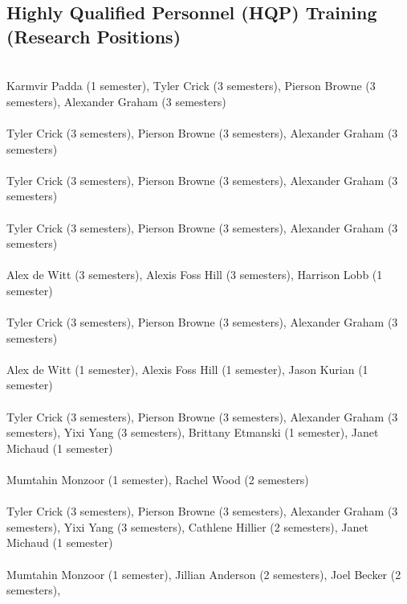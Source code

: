 \documentclass[11pt, a4paper]{article}
\newcommand{\note}[1]{\marginnote{\scriptsize #1}}
\begin{document}
\subsection*{Highly Qualified Personnel (HQP) Training (Research Positions)}
\note{2023}\\ Karmvir Padda (1 semester), Tyler
Crick (3 semesters), Pierson Browne (3 semesters), Alexander Graham (3
semesters) 
\\[.2cm]
\note{2022}\\ Tyler Crick (3 semesters), Pierson
Browne (3 semesters), Alexander Graham (3 semesters) 
\\[.2cm]
\note{2021}\\ Tyler Crick (3 semesters), Pierson
Browne (3 semesters), Alexander Graham (3 semesters) 
\\[.2cm]
\note{2020}\\ Tyler Crick (3 semesters), Pierson
Browne (3 semesters), Alexander Graham (3
semesters)  \\ \\ Alex de Witt (3 semesters),
Alexis Foss Hill (3 semesters), Harrison Lobb (1 semester)
\\[.2cm]
\note{2019}\\ Tyler Crick (3 semesters), Pierson
Browne (3 semesters), Alexander Graham (3
semesters)  \\ \\ Alex de Witt (1 semester),
Alexis Foss Hill (1 semester), Jason Kurian (1 semester)
\\[.2cm]
\note{2018}\\ Tyler Crick (3 semesters), Pierson
Browne (3 semesters), Alexander Graham (3 semesters), Yixi Yang (3
semesters), Brittany Etmanski (1 semester), Janet Michaud (1
semester)  \\ \\ Mumtahin Monzoor (1
semester), Rachel Wood (2 semesters)
\\[.2cm]
\note{2017}\\ Tyler Crick (3 semesters), Pierson
Browne (3 semesters), Alexander Graham (3 semesters), Yixi Yang (3
semesters), Cathlene Hillier (2 semesters), Janet Michaud (1
semester)  \\ \\ Mumtahin Monzoor (1
semester), Jillian Anderson (2 semesters), Joel Becker (2 semesters),
\end{document}
